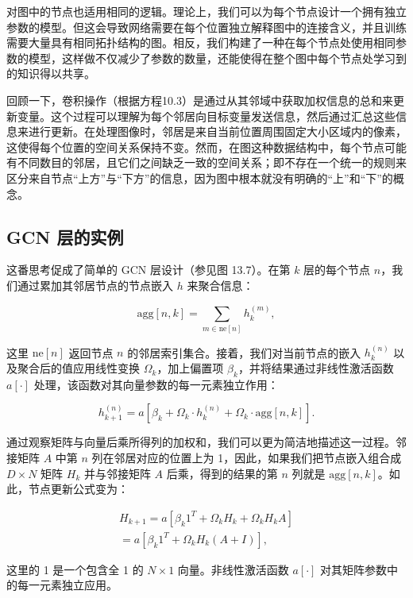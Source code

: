 对图中的节点也适用相同的逻辑。理论上，我们可以为每个节点设计一个拥有独立参数的模型。但这会导致网络需要在每个位置独立解释图中的连接含义，并且训练需要大量具有相同拓扑结构的图。相反，我们构建了一种在每个节点处使用相同参数的模型，这样做不仅减少了参数的数量，还能使得在整个图中每个节点处学习到的知识得以共享。

回顾一下，卷积操作（根据方程10.3）是通过从其邻域中获取加权信息的总和来更新变量。这个过程可以理解为每个邻居向目标变量发送信息，然后通过汇总这些信息来进行更新。在处理图像时，邻居是来自当前位置周围固定大小区域内的像素，这使得每个位置的空间关系保持不变。然而，在图这种数据结构中，每个节点可能有不同数目的邻居，且它们之间缺乏一致的空间关系；即不存在一个统一的规则来区分来自节点“上方”与“下方”的信息，因为图中根本就没有明确的“上”和“下”的概念。

\subsection{GCN 层的实例}
这番思考促成了简单的 GCN 层设计（参见图 13.7）。在第 \(k\) 层的每个节点 \(n\)，我们通过累加其邻居节点的节点嵌入 \(h\) 来聚合信息：

\begin{equation}
\text{agg}[n, k] = \sum_{m \in \text{ne}[n]} h_k^{(m)}, 
\end{equation}

这里 \(\text{ne}[n]\) 返回节点 \(n\) 的邻居索引集合。接着，我们对当前节点的嵌入 \(h_k^{(n)}\) 以及聚合后的值应用线性变换 \(\Omega_k\)，加上偏置项 \(\beta_k\)，并将结果通过非线性激活函数 \(a[\cdot]\) 处理，该函数对其向量参数的每一元素独立作用：

\begin{equation}
h_{k+1}^{(n)} = a \left[ \beta_k + \Omega_k \cdot h_k^{(n)} + \Omega_k \cdot \text{agg}[n, k] \right]. 
\end{equation}

通过观察矩阵与向量后乘所得列的加权和，我们可以更为简洁地描述这一过程。邻接矩阵 \(A\) 中第 \(n\) 列在邻居对应的位置上为 1，因此，如果我们把节点嵌入组合成 \(D \times N\) 矩阵 \(H_k\) 并与邻接矩阵 \(A\) 后乘，得到的结果的第 \(n\) 列就是 \(\text{agg}[n, k]\)。如此，节点更新公式变为：


\begin{align}
H_{k+1} = a [\beta_{k} 1^T + \Omega_k H_k + \Omega_k H_k A] \\
= a [\beta_{k} 1^T + \Omega_k H_k (A + I)], 
\end{align} 


这里的 1 是一个包含全 1 的 \(N \times 1\) 向量。非线性激活函数 \(a[\cdot]\) 对其矩阵参数中的每一元素独立应用。

